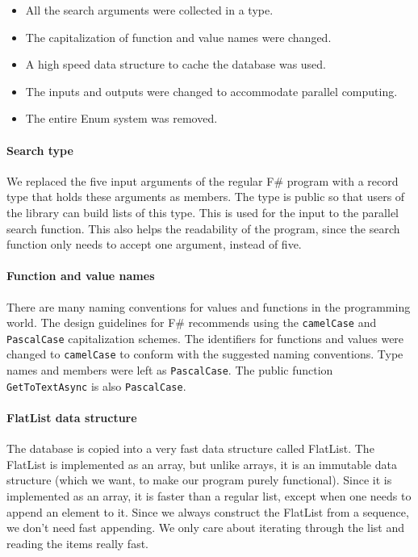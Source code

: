 \documentclass[12pt, a4paper]{article}
\newcommand{\code}[1]{{\small \texttt{#1}}}
\begin{document}
\begin{itemize}
	\item All the search arguments were collected in a type.
	\item The capitalization of function and value names were changed.
	\item A high speed data structure to cache the database was used.
	\item The inputs and outputs were changed to accommodate parallel computing.
	\item The entire Enum system was removed.
\end{itemize}

\paragraph{Search type} We replaced the five input arguments of the regular F\# program with a record type that holds these arguments as members. The type is public so that users of the library can build lists of this type. This is used for the input to the parallel search function. This also helps the readability of the program, since the search function only needs to accept one argument, instead of five.

\paragraph{Function and value names} There are many naming conventions for values and functions in the programming world. The design guidelines for F\# recommends using the \code{camelCase} and \code{PascalCase} capitalization schemes. The identifiers for functions and values were changed to \code{camelCase} to conform with the suggested naming conventions. Type names and members were left as \code{PascalCase}. The public function \code{GetToTextAsync} is also \code{PascalCase}.

\paragraph{FlatList data structure} The database is copied into a very fast data structure called FlatList. The FlatList is implemented as an array, but unlike arrays, it is an immutable data structure (which we want, to make our program purely functional). Since it is implemented as an array, it is faster than a regular list, except when one needs to append an element to it. Since we always construct the FlatList from a sequence, we don't need fast appending. We only care about iterating through the list and reading the items really fast.
\end{document}
